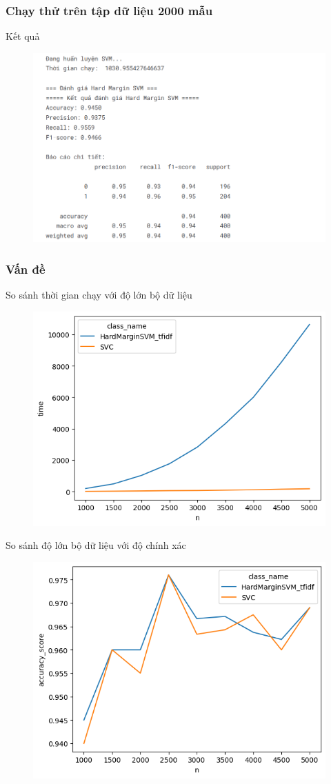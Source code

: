 \documentclass[serif, aspectratio=169]{beamer}
\begin{document}
	\subsubsection{Chạy thử trên tập dữ liệu 2000 mẫu}
	\begin{frame}{Kết quả}
		\begin{figure}
			\centering
			\includegraphics[width=0.6\linewidth]{pic/hardmargin-svm-result2000.png}
			\label{fig:hardmargin-svm-result2000}
		\end{figure}
	\end{frame}
	
	\subsubsection{Vấn đề}
	\begin{frame}{So sánh thời gian chạy với độ lớn bộ dữ liệu}
		\begin{figure}
			\centering
			\includegraphics[width=0.6\linewidth]{pic/n-time-hardmargin-svm.png}
			\label{fig:n-time-hardmargin-svm}
		\end{figure}
	\end{frame}
	
	\begin{frame}{So sánh độ lớn bộ dữ liệu với độ chính xác}
		\begin{figure}
			\centering
			\includegraphics[width=0.6\linewidth]{pic/n-acc-hardmargin-svm.png}
			\label{fig:n-acc-hardmargin-svm}
		\end{figure}
	\end{frame}
	
\end{document}
